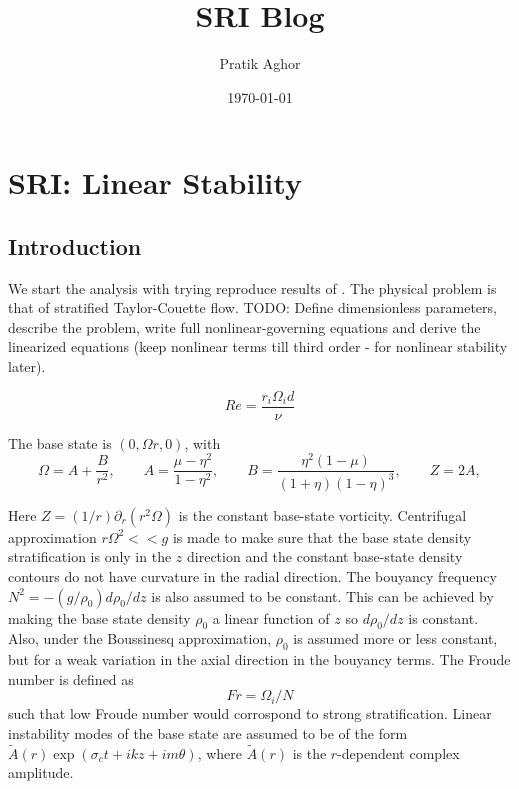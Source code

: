 \documentclass{article}
\author{Pratik Aghor}
\title{SRI Blog}
\date{\today}  %
\begin{document}
\maketitle
\section*{SRI: Linear Stability}
\subsection*{Introduction}

We start the analysis with trying reproduce results of \cite{robins2020viscous}. The physical problem is that of stratified Taylor-Couette flow. 
TODO: Define dimensionless parameters, describe the problem, write full nonlinear-governing equations and derive the linearized equations (keep nonlinear terms till third order - for nonlinear stability later).

\begin{equation}\label{def:Re}
 Re = \frac{r_{i}\Omega_{i}d}{\nu}
\end{equation}

The base state is $(0, \Omega r, 0)$, with 
 \noindent
\begin{equation}
\Omega = A + \frac{B}{r^{2}},
\qquad
A = \frac{\mu - \eta^{2}}{1-\eta^{2}},
\qquad
B = \frac{\eta^{2}(1-\mu)}{(1+\eta)(1-\eta)^{3}},
\qquad
Z = 2A,
\label{eqn:base_state}
\end{equation}

Here $Z = (1/r) \partial_{r}(r^{2}\Omega)$ is the constant base-state vorticity. 
Centrifugal approximation $r\Omega^{2}<<g$ is made to make sure that the base state density stratification is only in the $z$ direction and the constant base-state density contours do not have curvature in the radial direction. The bouyancy frequency $N^{2} = -(g/\rho_{0})d\rho_{0}/dz$ is also assumed to be constant. This can be achieved by making the base state density $\rho_{0}$ a linear function of $z$ so $d\rho_{0}/dz$ is constant. Also, under the Boussinesq approximation, $\rho_{0}$ is assumed more or less constant, but for a weak variation in the axial direction in the bouyancy terms. The Froude number is defined as 
\begin{equation}\label{def:Fr}
 Fr = \Omega_{i}/N
\end{equation}
such that low Froude number would corrospond to strong stratification. Linear instability modes of the base state are assumed to be of the form  $\tilde{A}(r) \exp{(\sigma_{c}t + i k z + i m \theta)}$, where $\tilde{A}(r)$ is the $r$-dependent complex amplitude. 
\end{document}
